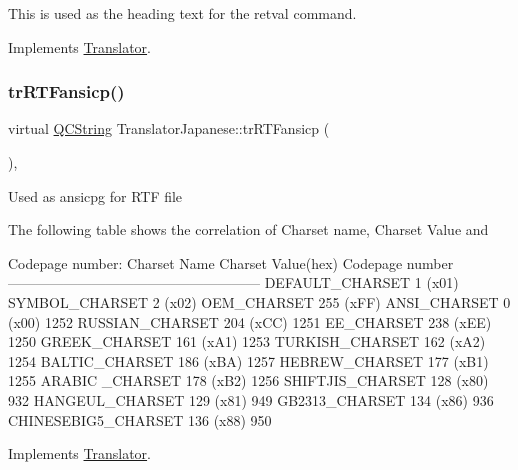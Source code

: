 This is used as the heading text for the retval command. 

Implements \mbox{\hyperlink{class_translator}{Translator}}.

\mbox{\label{class_translator_japanese_a1d3e75d8d22d0d3f04acd4339bba931d}} 
\subsubsection{\texorpdfstring{trRTFansicp()}{trRTFansicp()}}
{\footnotesize\ttfamily virtual \mbox{\hyperlink{class_q_c_string}{Q\+C\+String}} Translator\+Japanese\+::tr\+R\+T\+Fansicp (\begin{DoxyParamCaption}{ }\end{DoxyParamCaption})\hspace{0.3cm}{\ttfamily [inline]}, {\ttfamily [virtual]}}

Used as ansicpg for R\+TF file

The following table shows the correlation of Charset name, Charset Value and 
\begin{DoxyPre}
Codepage number:
Charset Name       Charset Value(hex)  Codepage number
------------------------------------------------------
DEFAULT\_CHARSET           1 (x01)
SYMBOL\_CHARSET            2 (x02)
OEM\_CHARSET             255 (xFF)
ANSI\_CHARSET              0 (x00)            1252
RUSSIAN\_CHARSET         204 (xCC)            1251
EE\_CHARSET              238 (xEE)            1250
GREEK\_CHARSET           161 (xA1)            1253
TURKISH\_CHARSET         162 (xA2)            1254
BALTIC\_CHARSET          186 (xBA)            1257
HEBREW\_CHARSET          177 (xB1)            1255
ARABIC \_CHARSET         178 (xB2)            1256
SHIFTJIS\_CHARSET        128 (x80)             932
HANGEUL\_CHARSET         129 (x81)             949
GB2313\_CHARSET          134 (x86)             936
CHINESEBIG5\_CHARSET     136 (x88)             950
\end{DoxyPre}
 

Implements \mbox{\hyperlink{class_translator_a9953a4c0e6a4fc7d017abcd5c2939e0f}{Translator}}.

\mbox{\label{class_translator_japanese_a4a63767c84738f67dec5afa48da40760}} 
